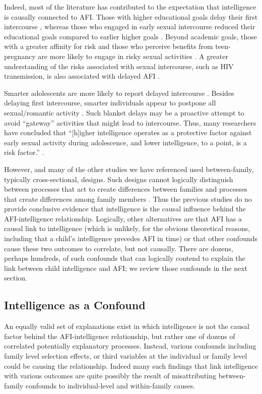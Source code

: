 Indeed, most of the literature has contributed to the expectation that intelligence is causally connected to AFI. Those with higher educational goals delay their first intercourse \citep{boislard2011individual,schvaneveldt2001academic}, whereas those who engaged in early sexual intercourse reduced their educational goals compared to earlier higher goals \citep{schvaneveldt2001academic}. Beyond academic goals, those with a greater affinity for risk and those who perceive benefits from teen-pregnancy are more likely to engage in risky sexual activities \citep{raffaelli2003sexual}. A greater understanding of the risks associated with sexual intercourse, such as HIV transmission, is also associated with delayed AFI \citep{mathews2009predictors}.

Smarter adolescents are more likely to report delayed intercourse \citep{halpern2000smart,mott1983early,Paul2000,Woodward2001}. Besides delaying first intercourse, smarter individuals appear to postpone all sexual/romantic activity \citep{halpern2000smart}. Such blanket delays may be a proactive attempt to avoid ``gateway'' activities that might lead to intercourse. Thus, many researchers have concluded that ``[h]igher intelligence operates as a protective factor against early sexual activity during adolescence, and lower intelligence, to a point, is a risk factor.'' \citep[][p. 213]{halpern2000smart}.

However, \citet{halpern2000smart} and many of the other studies we have referenced \citep[e.g.,][]{mathews2009predictors,miller1997timing,Paul2000} used between-family, typically cross-sectional, designs. Such designs cannot logically distinguish between processes that act to create differences between families and processes that create differences among family members \citep{Lahey2010,Rodgers2000}. Thus the previous studies do no provide conclusive evidence that intelligence is the causal influence behind the AFI-intelligence relationship. Logically, other alternatives are that AFI has a causal link to intelligence (which is unlikely, for the obvious theoretical reasons, including that a child's intelligence precedes AFI in time) or that other confounds cause these two outcomes to correlate, but not causally. There are dozens, perhaps hundreds, of such confounds that can logically contend to explain the link between child intelligence and AFI; we review those confounds in the next section.
%
\subsection{Intelligence as a Confound}
An equally valid set of explanations exist in which intelligence is not the causal factor behind the AFI-intelligence relationship, but rather one of dozens of correlated potentially explanatory processes. Instead, various confounds including family level selection effects, or third variables at the individual or family level could be causing the relationship. Indeed many such findings that link intelligence with various outcomes are quite possibly the result of misattributing between-family confounds to individual-level and within-family causes.

